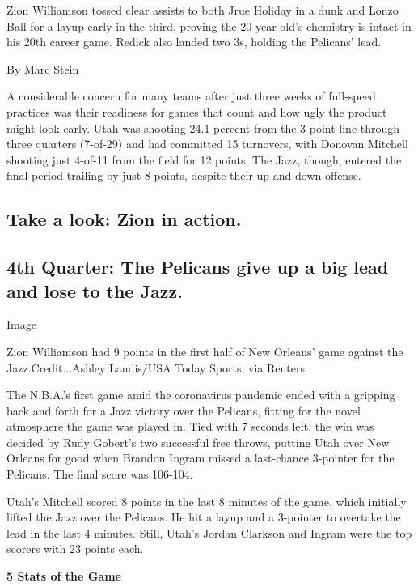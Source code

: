Zion Williamson tossed clear assists to both Jrue Holiday in a dunk and
Lonzo Ball for a layup early in the third, proving the 20-year-old's
chemistry is intact in his 20th career game. Redick also landed two 3s,
holding the Pelicans' lead.

By Marc Stein

A considerable concern for many teams after just three weeks of
full-speed practices was their readiness for games that count and how
ugly the product might look early. Utah was shooting 24.1 percent from
the 3-point line through three quarters (7-of-29) and had committed 15
turnovers, with Donovan Mitchell shooting just 4-of-11 from the field
for 12 points. The Jazz, though, entered the final period trailing by
just 8 points, despite their up-and-down offense.

\hypertarget{take-a-look-zion-in-action}{%
\subsection{Take a look: Zion in
action.}\label{take-a-look-zion-in-action}}

\hypertarget{4th-quarter-the-pelicans-give-up-a-big-lead-and-lose-to-the-jazz}{%
\subsection{4th Quarter: The Pelicans give up a big lead and lose to the
Jazz.}\label{4th-quarter-the-pelicans-give-up-a-big-lead-and-lose-to-the-jazz}}

Image

Zion Williamson had 9 points in the first half of New Orleans' game
against the Jazz.Credit...Ashley Landis/USA Today Sports, via Reuters

The N.B.A.'s first game amid the coronavirus pandemic ended with a
gripping back and forth for a Jazz victory over the Pelicans, fitting
for the novel atmosphere the game was played in. Tied with 7 seconds
left, the win was decided by Rudy Gobert's two successful free throws,
putting Utah over New Orleans for good when Brandon Ingram missed a
last-chance 3-pointer for the Pelicans. The final score was 106-104.

Utah's Mitchell scored 8 points in the last 8 minutes of the game, which
initially lifted the Jazz over the Pelicans. He hit a layup and a
3-pointer to overtake the lead in the last 4 minutes. Still, Utah's
Jordan Clarkson and Ingram were the top scorers with 23 points each.

\textbf{5 Stats of the Game}

